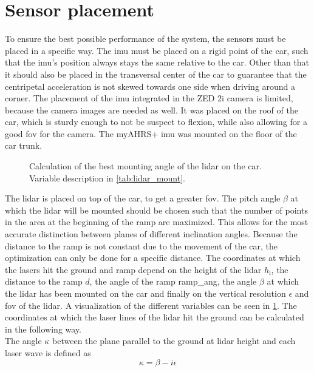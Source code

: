 \section{Sensor placement}
To ensure the best possible performance of the system, the sensors must be placed in a specific way.
The \gls{imu} must be placed on a rigid point of the car, such that the \gls{imu}'s position always stays the same relative to the car.
Other than that it should also be placed in the transversal center of the car to guarantee that the centripetal acceleration is not skewed towards one side when driving around a corner.
The placement of the \gls{imu} integrated in the ZED 2i camera is limited, because the camera images are needed as well.
It was placed on the roof of the car, which is sturdy enough to not be suspect to flexion, while also allowing for a good \gls{fov} for the camera.
The myAHRS+ \gls{imu} was mounted on the floor of the car trunk.\\
\begin{figure}[htpb]
	\centering
	
	\caption[\acrshort{lidar} placement on the car]{Calculation of the best mounting angle of the \acrshort{lidar} on the car. Variable description in \cref{tab:lidar_mount}.}
	\label{fig:tikz_lidar_mount}
\end{figure}
The \gls{lidar} is placed on top of the car, to get a greater \gls{fov}.
The pitch angle $\beta$ at which the \gls{lidar} will be mounted should be chosen such that the number of points in the area at the beginning of the ramp are maximized.
This allows for the most accurate distinction between planes of different inclination angles.
Because the distance to the ramp is not constant due to the movement of the car, the optimization can only be done for a specific distance.
The coordinates at which the lasers hit the ground and ramp depend on the height of the \gls{lidar} $h_\mathrm{l}$, the distance to the ramp $d$, the angle of the ramp \gls{ramp_ang}, the angle $\beta$ at which the \gls{lidar} has been mounted on the car and finally on the vertical resolution $\epsilon$ and \gls{fov} of the \gls{lidar}.
A visualization of the different variables can be seen in \cref{fig:tikz_lidar_mount}.
The coordinates at which the laser lines of the \gls{lidar} hit the ground can be calculated in the following way.\\
The angle $\kappa$ between the plane parallel to the ground at \gls{lidar} height and each laser wave is defined as
\begin{equation}
	\kappa = \beta - i\epsilon
\end{equation}
